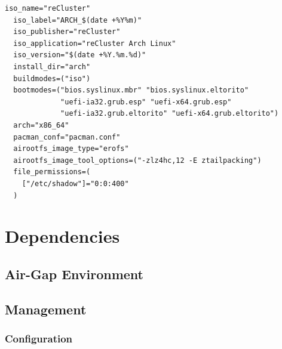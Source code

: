 \begin{lstlisting}[language=shell, morekeywords={[4]{iso_name, iso_label, iso_publisher, iso_application, iso_version, install_dir, buildmodes, bootmodes, arch, pacman_conf, airootfs_image_type, airootfs_image_tool_options, file_permissions}}, xleftmargin=\parindent, label={lst:arch}, caption=Contents of \texttt{profiledef.sh} file which shows the reCluster profile definition]
  iso_name="reCluster"
  iso_label="ARCH_$(date +%Y%m)"
  iso_publisher="reCluster"
  iso_application="reCluster Arch Linux"
  iso_version="$(date +%Y.%m.%d)"
  install_dir="arch"
  buildmodes=("iso")
  bootmodes=("bios.syslinux.mbr" "bios.syslinux.eltorito"
             "uefi-ia32.grub.esp" "uefi-x64.grub.esp"
             "uefi-ia32.grub.eltorito" "uefi-x64.grub.eltorito")
  arch="x86_64"
  pacman_conf="pacman.conf"
  airootfs_image_type="erofs"
  airootfs_image_tool_options=("-zlz4hc,12 -E ztailpacking")
  file_permissions=(
    ["/etc/shadow"]="0:0:400"
  )
\end{lstlisting}

\section{Dependencies}
\label{sec:implementation_dependencies}


\subsection{Air-Gap Environment}
\label{subsec:implementation_dependencies_air_gap_environment}

\subsection{Management}
\label{subsec:implementation_dependencies_management}

\subsubsection{Configuration}
\label{subsec:implementation_dependencies_management_configuration}

